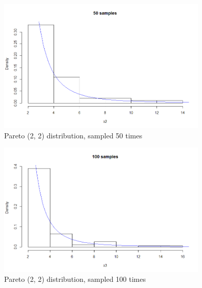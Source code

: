 \documentclass{article}
\begin{document}
\begin{enumerate}
\begin{soln}
			\begin{figure}[ht]
				\centering
				\includegraphics[width=10cm]{50Pareto.png}
				\caption{Pareto (2, 2) distribution, sampled 50 times}
			\end{figure}
			
			\begin{figure}[ht]
				\centering
				\includegraphics[width=10cm]{100pareto.png}
				\caption{Pareto (2, 2) distribution, sampled 100 times}
			\end{figure}
			
		\end{soln}
		
\end{enumerate}
\end{document}
